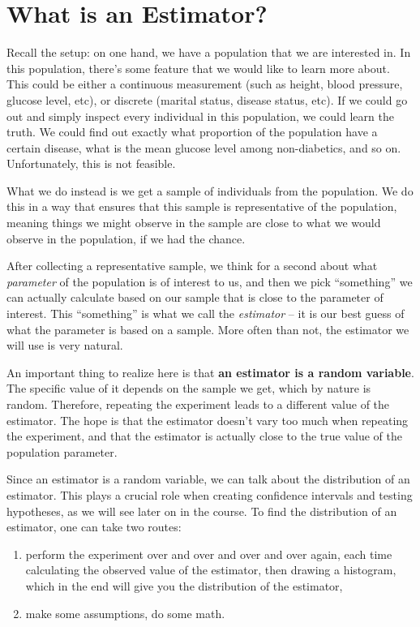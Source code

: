 \documentclass[]{book}
\providecommand{\tightlist}{%
  \setlength{\itemsep}{0pt}\setlength{\parskip}{0pt}}
\theoremstyle{definition}
\theoremstyle{definition}
\theoremstyle{definition}
\theoremstyle{remark}
\begin{document}
\hypertarget{what-is-an-estimator}{%
\section{What is an Estimator?}\label{what-is-an-estimator}}

Recall the setup: on one hand, we have a population that we are interested in. In this population, there's some feature that we would like to learn more about. This could be either a continuous measurement (such as height, blood pressure, glucose level, etc), or discrete (marital status, disease status, etc). If we could go out and simply inspect every individual in this population, we could learn the truth. We could find out exactly what proportion of the population have a certain disease, what is the mean glucose level among non-diabetics, and so on. Unfortunately, this is not feasible.

What we do instead is we get a sample of individuals from the population. We do this in a way that ensures that this sample is representative of the population, meaning things we might observe in the sample are close to what we would observe in the population, if we had the chance.

After collecting a representative sample, we think for a second about what \emph{parameter} of the population is of interest to us, and then we pick ``something'' we can actually calculate based on our sample that is close to the parameter of interest. This ``something'' is what we call the \emph{estimator} -- it is our best guess of what the parameter is based on a sample. More often than not, the estimator we will use is very natural.

An important thing to realize here is that \textbf{an estimator is a random variable}. The specific value of it depends on the sample we get, which by nature is random. Therefore, repeating the experiment leads to a different value of the estimator. The hope is that the estimator doesn't vary too much when repeating the experiment, and that the estimator is actually close to the true value of the population parameter.

Since an estimator is a random variable, we can talk about the distribution of an estimator. This plays a crucial role when creating confidence intervals and testing hypotheses, as we will see later on in the course. To find the distribution of an estimator, one can take two routes:

\begin{enumerate}
\def\labelenumi{\arabic{enumi}.}
\tightlist
\item
  perform the experiment over and over and over and over again, each time calculating the observed value of the estimator, then drawing a histogram, which in the end will give you the distribution of the estimator,
\item
  make some assumptions, do some math.
\end{enumerate}
\end{document}
